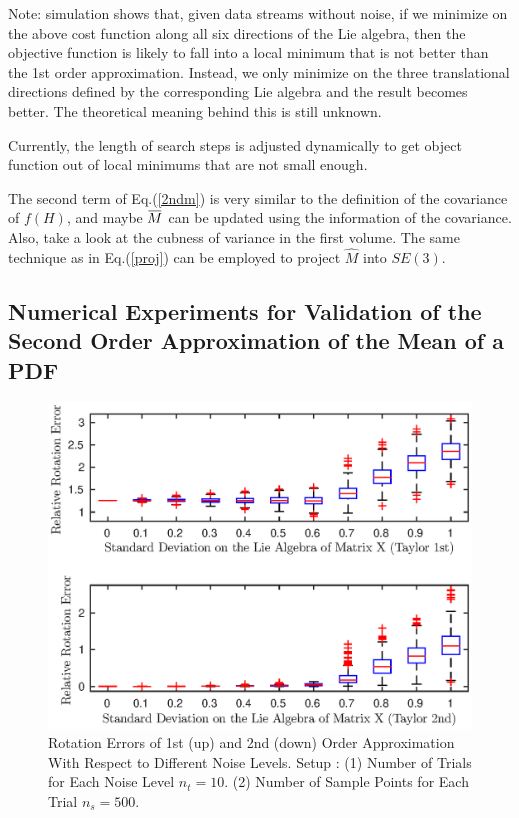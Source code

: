 \documentclass[twocolumn,10pt]{asme2ej}
\newcommand{\overbar}[1]{\mkern 1.5mu\overline{\mkern-1.5mu#1\mkern-1.5mu}\mkern 1.5mu}
\begin{document}
Note: simulation shows that, given data streams without noise, if we minimize on the above cost function along all six directions of the Lie algebra, then the objective function is likely to fall into a local minimum that is not better than the 1st order approximation. Instead, we only minimize on the three translational directions defined by the corresponding Lie algebra and the result becomes better. The theoretical meaning behind this is still unknown. 

Currently, the length of search steps is adjusted dynamically to get object function out of local minimums that are not small enough. 

The second term of Eq.(\ref{2ndm}) is very similar to the definition of the covariance of $f(H)$, and maybe  $\overbar{M}$ can be updated using the information of the covariance. Also, take a look at the cubness of variance in the first volume. 
The same technique as in Eq.(\ref{proj}) can be employed to project $\widehat{M}$ into $SE(3)$.



\subsection{Numerical Experiments for Validation of the Second Order Approximation of the Mean of a PDF}


\begin{figure}[h]\label{mean_approx_rot}
\includegraphics[scale = 0.60]{Mean_Definition_Figures/mean_rot_rel_10.eps}
\caption{Rotation Errors of 1st (up) and 2nd (down) Order Approximation With Respect to Different Noise Levels. Setup : (1) Number of Trials for Each Noise Level $n_t = 10$. (2) Number of Sample Points for Each Trial $n_s = 500$. }
\centering
\end{figure}
\end{document}
